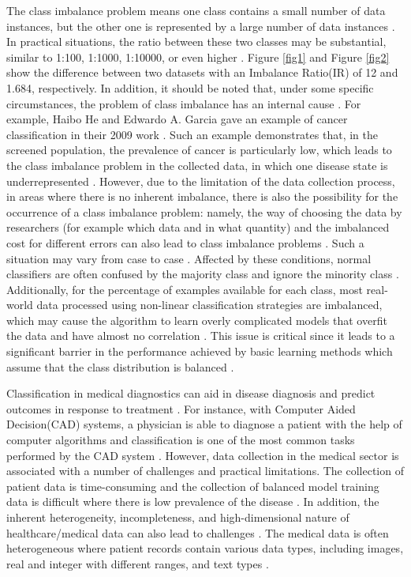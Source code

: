 The class imbalance problem means one class contains a small number of data instances, but the other one is represented by a large number of data instances \cite{10}. In practical situations, the ratio between these two classes may be substantial, similar to 1:100, 1:1000, 1:10000, or even higher \cite{1}. Figure \ref{fig1} and Figure \ref{fig2} show the difference between two datasets with an  Imbalance Ratio(IR) of 12 and 1.684,  respectively. In addition, it should be noted that, under some specific circumstances, the problem of class imbalance has an internal cause \cite{1}. For example, Haibo He and Edwardo A. Garcia gave an example of cancer classification in their 2009 work \cite{17}. Such an example demonstrates that, in the screened population, the prevalence of cancer is particularly low, which leads to the class imbalance problem in the collected data, in which one disease state is underrepresented \cite{17}. However, due to the limitation of the data collection process, in areas where there is no inherent imbalance, there is also the possibility for the occurrence of a class imbalance problem: namely, the way of choosing the data by researchers (for example which data and in what quantity) and the imbalanced cost for different errors can also lead to class imbalance problems \cite{1}. Such a situation may vary from case to case \cite{1}. Affected by these conditions, normal classifiers are often confused by the majority class and ignore the minority class \cite{1}. Additionally, for the percentage of examples available for each class, most real-world data processed using non-linear classification strategies are imbalanced, which may cause the algorithm to learn overly complicated models that overfit the data and have almost no correlation \cite{2}. This issue is critical since it leads to a significant barrier in the performance achieved by basic learning methods which assume that the class distribution is balanced \cite{2}.

Classification in medical diagnostics can aid in disease diagnosis and predict outcomes in response to treatment \cite{3}. For instance, with Computer Aided Decision(CAD) systems, a physician is able to diagnose a patient with the help of computer algorithms and classification is one of the most common tasks performed by the CAD system \cite{4}. However, data collection in the medical sector is associated with a number of challenges and practical limitations. The collection of patient data is time-consuming \cite{4} and the collection of balanced model training data is difficult where there is low prevalence of the disease \cite{7}. In addition, the inherent heterogeneity, incompleteness, and high-dimensional nature of healthcare/medical data can also lead to challenges \cite{5}. The medical data is often heterogeneous where patient records contain various data types, including images, real and integer with different ranges, and text types \cite{5}.

